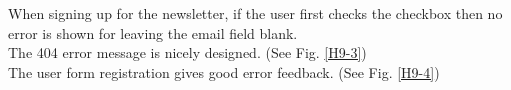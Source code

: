 \begin{itemize}
        When signing up for the newsletter, if the user first checks the checkbox then no error is shown for leaving the email field blank.\\
        The 404 error message is nicely designed. (See Fig. \ref{H9-3})\\
        The user form registration gives good error feedback. (See Fig. \ref{H9-4})
        \begin{figure}[!ht]
            \begin{minipage}[c]{0.5\textwidth}
                \centering
                \captionsetup{justification=centering}
                \caption{}
                \label{H9-1}
            \end{minipage}
            \begin{minipage}[c]{0.5\textwidth}
                \centering
                \captionsetup{justification=centering}
                \caption{}
                \label{H9-2}
            \end{minipage}
        \end{figure}
        \begin{figure}[!ht]
            \begin{minipage}[c]{1\textwidth}
                \centering

\end{minipage}
\end{figure}
\end{itemize}
